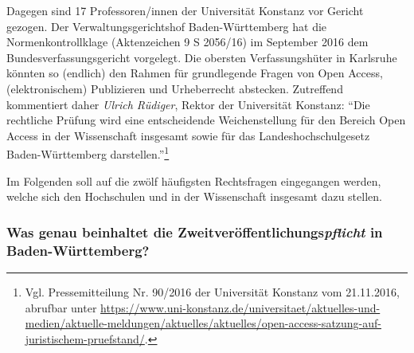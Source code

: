 \documentclass[a4paper,
fontsize=11pt,
oneside,
numbers=noperiodatend,
parskip=half-,
bibliography=totoc,
final
]{scrartcl}
\begin{document}
Dagegen sind 17 Professoren/innen der Universität Konstanz vor Gericht
gezogen. Der Verwaltungsgerichtshof Baden-Württemberg hat die
Normenkontrollklage (Aktenzeichen 9 S 2056/16) im September 2016 dem
Bundesverfassungsgericht vorgelegt. Die obersten Verfassungshüter in
Karlsruhe könnten so (endlich) den Rahmen für grundlegende Fragen von
Open Access, (elektronischem) Publizieren und Urheberrecht abstecken.
Zutreffend kommentiert daher \emph{Ulrich Rüdiger}, Rektor der
Universität Konstanz: \enquote{Die rechtliche Prüfung wird eine
entscheidende Weichenstellung für den Bereich Open Access in der
Wissenschaft insgesamt sowie für das Landeshochschulgesetz
Baden-Württemberg darstellen.}\footnote{Vgl. Pressemitteilung Nr.
  90/2016 der Universität Konstanz vom 21.11.2016, abrufbar unter
  \url{https://www.uni-konstanz.de/universitaet/aktuelles-und-medien/aktuelle-meldungen/aktuelles/aktuelles/open-access-satzung-auf-juristischem-pruefstand/}.}

Im Folgenden soll auf die zwölf häufigsten Rechtsfragen eingegangen
werden, welche sich den Hochschulen und in der Wissenschaft insgesamt
dazu stellen.

\hypertarget{was-genau-beinhaltet-die-zweitveruxf6ffentlichungspflicht-in-baden-wuxfcrttemberg}{%
\subsubsection{\texorpdfstring{Was genau beinhaltet die
Zweitveröffentlichungs\emph{pflicht} in
Baden-Württemberg?}{Was genau beinhaltet die Zweit\-ver\-öffent\-lich\-ungs\-pflicht in Baden-Württemberg?}}\label{was-genau-beinhaltet-die-zweitveruxf6ffentlichungspflicht-in-baden-wuxfcrttemberg}}
\end{document}
